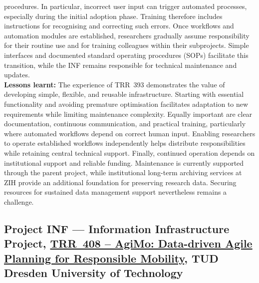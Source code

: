 \documentclass{eceasst}
\begin{document}
procedures. In particular, incorrect user input can
trigger automated processes, especially during the
initial adoption phase. Training therefore includes
instructions for recognising and correcting such errors.
Once workflows and automation modules are established,
researchers gradually assume responsibility for their
routine use and for training colleagues within their
subprojects. Simple interfaces and documented standard
operating procedures (SOPs) facilitate this transition,
while the INF remains responsible for technical
maintenance and updates.
\\
\noindent\textbf{Lessons learnt:}
The experience of TRR~393 demonstrates the value of
developing simple, flexible, and reusable infrastructure.
Starting with essential functionality and avoiding premature optimisation facilitates
adaptation to new requirements while limiting maintenance complexity.
Equally important are clear documentation, continuous
communication, and practical training, particularly
where automated workflows depend on correct human input.
Enabling researchers to operate established workflows
independently helps distribute responsibilities while
retaining central technical support.
Finally, continued operation depends on institutional
support and reliable funding. Maintenance is currently
supported through the parent project, while institutional
long-term archiving services at ZIH provide an additional
foundation for preserving research data. Securing
resources for sustained data management support
nevertheless remains a challenge.


\subsection{Project INF --- Information Infrastructure Project,
\href{https://gepris.dfg.de/gepris/projekt/531327426?language=en}
{TRR~408 -- AgiMo: Data-driven Agile Planning for Responsible
Mobility}, TUD Dresden University of Technology}
\label{subsec:trr408}
\end{document}
